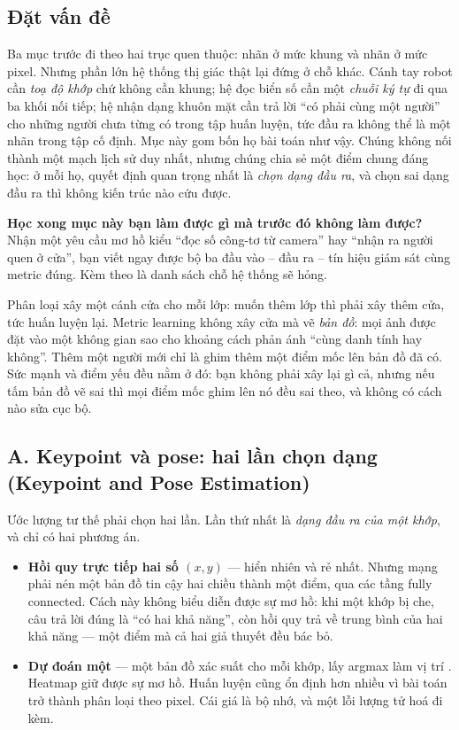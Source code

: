 \documentclass[../../../deep_learning.tex]{subfiles}
\begin{document}
\subsection{Đặt vấn đề}
Ba mục trước đi theo hai trục quen thuộc: nhãn ở mức khung và nhãn ở mức pixel. Nhưng phần lớn hệ thống thị giác thật lại đứng ở chỗ khác. Cánh tay robot cần \emph{toạ độ khớp} chứ không cần khung; hệ đọc biển số cần một \emph{chuỗi ký tự} đi qua ba khối nối tiếp; hệ nhận dạng khuôn mặt cần trả lời ``có phải cùng một người'' cho những người chưa từng có trong tập huấn luyện, tức đầu ra không thể là một nhãn trong tập cố định. Mục này gom bốn họ bài toán như vậy.
 Chúng không nối thành một mạch lịch sử duy nhất, nhưng chúng chia sẻ một điểm chung đáng học: ở mỗi họ, quyết định quan trọng nhất là \emph{chọn dạng đầu ra}, và chọn sai dạng đầu ra thì không kiến trúc nào cứu được.

\textbf{Học xong mục này bạn làm được gì mà trước đó không làm được?} Nhận một yêu cầu mơ hồ kiểu ``đọc số công-tơ từ camera'' hay ``nhận ra người quen ở cửa'', bạn viết ngay được bộ ba đầu vào -- đầu ra -- tín hiệu giám sát cùng metric đúng. Kèm theo là danh sách chỗ hệ thống sẽ hỏng.

\begin{trucgiac}
Phân loại xây một cánh cửa cho mỗi lớp: muốn thêm lớp thì phải xây thêm cửa, tức huấn luyện lại. Metric learning không xây cửa mà vẽ \emph{bản đồ}: mọi ảnh được đặt vào một không gian sao cho khoảng cách phản ánh ``cùng danh tính hay không''. Thêm một người mới chỉ là ghim thêm một điểm mốc lên bản đồ đã có. Sức mạnh và điểm yếu đều nằm ở đó: bạn không phải xây lại gì cả, nhưng nếu tấm bản đồ vẽ sai thì mọi điểm mốc ghim lên nó đều sai theo, và không có cách nào sửa cục bộ.
\end{trucgiac}

\subsection{A. Keypoint và pose: hai lần chọn dạng (Keypoint and Pose Estimation)}
Ước lượng tư thế phải chọn hai lần. Lần thứ nhất là \emph{dạng đầu ra của một khớp}, và chỉ có hai phương án.

\begin{itemize}
\item \textbf{Hồi quy trực tiếp hai số \((x,y)\)} --- hiển nhiên và rẻ nhất. Nhưng mạng phải nén một bản đồ tin cậy hai chiều thành một điểm, qua các tầng fully connected. Cách này không biểu diễn được sự mơ hồ: khi một khớp bị che, câu trả lời đúng là ``có hai khả năng'', còn hồi quy trả về trung bình của hai khả năng --- một điểm mà cả hai giả thuyết đều bác bỏ.
\item \textbf{Dự đoán một } --- một bản đồ xác suất cho mỗi khớp, lấy argmax làm vị trí \cite{sun2019hrnet}. Heatmap giữ được sự mơ hồ. Huấn luyện cũng ổn định hơn nhiều vì bài toán trở thành phân loại theo pixel. Cái giá là bộ nhớ, và một lỗi lượng tử hoá đi kèm.
\end{itemize}
\end{document}
